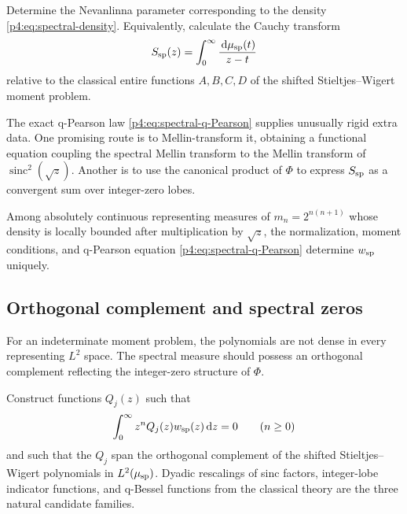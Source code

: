 \documentclass[11pt,oneside]{article}
\theoremstyle{definition}
\theoremstyle{remark}
\newcommand{\sinc}{\operatorname{sinc}}
\newcommand{\dd}{\,\mathrm d}
\begin{document}
\begin{problem}
\label{p4:prob:Nevanlinna}
Determine the Nevanlinna parameter corresponding to the density
\eqref{p4:eq:spectral-density}.  Equivalently, calculate the Cauchy transform
\begin{equation}
 S_{\rm sp}(z)=\int_0^\infty\frac{\dd\mu_{\rm sp}(t)}{z-t}
 \label{p4:eq:spectral-Stieltjes-transform}
\end{equation}
relative to the classical entire functions $A,B,C,D$ of the shifted
Stieltjes--Wigert moment problem.
\end{problem}

The exact q-Pearson law \eqref{p4:eq:spectral-q-Pearson} supplies unusually rigid extra data.
One promising route is to Mellin-transform it, obtaining a functional equation coupling the
spectral Mellin transform to the Mellin transform of $\sinc^2(\sqrt z)$.  Another is to use
the canonical product of $\Phi$ to express $S_{\rm sp}$ as a convergent sum over integer-zero
lobes.

\begin{conjecture}
\label{p4:conj:sinc-Pearson-uniqueness}
Among absolutely continuous representing measures of
$m_n=2^{n(n+1)}$ whose density is locally bounded after multiplication by $\sqrt z$, the
normalization, moment conditions, and q-Pearson equation
\eqref{p4:eq:spectral-q-Pearson} determine $w_{\rm sp}$ uniquely.
\end{conjecture}

\subsection{Orthogonal complement and spectral zeros}

For an indeterminate moment problem, the polynomials are not dense in every representing
$L^2$ space.  The spectral measure should possess an orthogonal complement reflecting the
integer-zero structure of $\Phi$.

\begin{problem}
Construct functions $Q_j(z)$ such that
\[
 \int_0^\infty z^nQ_j(z)w_{\rm sp}(z)\dd z=0
 \qquad(n\geq0)
\]
and such that the $Q_j$ span the orthogonal complement of the shifted
Stieltjes--Wigert polynomials in $L^2(\mu_{\rm sp})$.  Dyadic rescalings of sinc factors,
integer-lobe indicator functions, and q-Bessel functions from the classical theory are the
three natural candidate families.
\end{problem}
\end{document}
